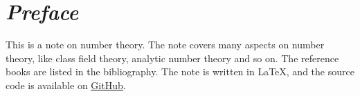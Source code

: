 \chapter*{\emph{Preface}}

This is a note on number theory. The note covers many aspects on number theory, like class field theory, analytic number theory and so on. The reference books are listed in the bibliography. The note is written in \LaTeX, and the source code is available on \href{https://github.com/fanyf22/Notes-on-Number-Theory}{GitHub}.
